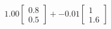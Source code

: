 \documentclass[preview]{standalone}
\begin{document}
\begin{align*}
1.00 \begin{bmatrix} 0.8 \\ 0.5 \end{bmatrix} + -0.01 \begin{bmatrix} 1 \\ 1.6 \end{bmatrix}
\end{align*}
\end{document}
